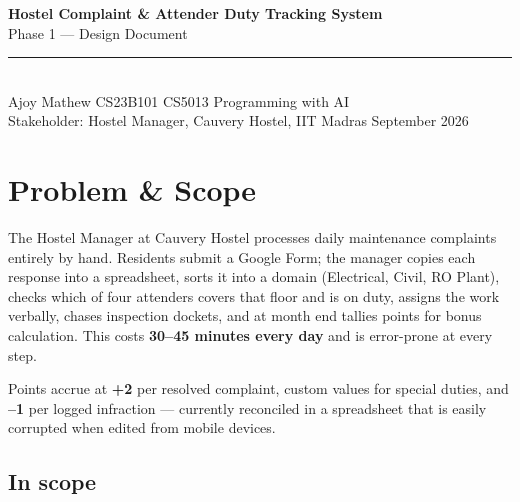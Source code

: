 \documentclass[10pt,a4paper]{article}
\begin{document}
\thispagestyle{empty}
\begin{center}
  {\LARGE\bfseries\color{accent} Hostel Complaint \& Attender Duty Tracking System}\\[3pt]
  {\large Phase 1 --- Design Document}\\[7pt]
  \textcolor{rulec}{\rule{0.62\linewidth}{0.8pt}}\\[7pt]
  {\normalsize Ajoy Mathew \quad\textbullet\quad CS23B101 \quad\textbullet\quad
   CS5013 Programming with AI}\\[2pt]
  {\small Stakeholder: Hostel Manager, Cauvery Hostel, IIT Madras \quad\textbullet{} September 2026}
\end{center}
\vspace{-2pt}


\section{Problem \& Scope}

The Hostel Manager at Cauvery Hostel processes daily maintenance complaints entirely by hand.
Residents submit a Google Form; the manager copies each response into a spreadsheet, sorts it into
a domain (Electrical, Civil, RO Plant), checks which of four attenders covers that floor and is on
duty, assigns the work verbally, chases inspection dockets, and at month end tallies points for
bonus calculation. This costs \textbf{30--45 minutes every day} and is error-prone at every step.

Points accrue at \textbf{+2} per resolved complaint, custom values for special duties, and
\textbf{--1} per logged infraction --- currently reconciled in a spreadsheet that is easily
corrupted when edited from mobile devices.

\subsection{In scope}
\end{document}
